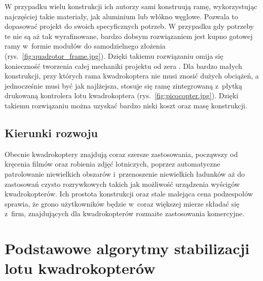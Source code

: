\documentclass[11pt, twoside]{Thesis} %
\begin{document}
W przypadku wielu konstrukcji ich autorzy sami konstruują ramę, wykorzystując najczęściej takie materiały, jak aluminium lub włókno węglowe. Pozwala to dopasować projekt do swoich specyficznych potrzeb. W przypadku gdy potrzeby te nie są aż tak wyrafinowane, bardzo dobsym rozwiązaniem jest kupno gotowej ramy w~formie modułów do samodzielnego złożenia (rys.~\ref{fig:quadrotor_frame.jpg}). Dzięki takiemu rozwiązaniu omija się konieczność tworzenia całej mechaniki projektu od zera . Dla bardzo małych konstrukcji, przy których rama kwadrokoptera nie musi znosić dużych obciążeń, a jednocześnie musi być jak najlżejsza, stosuje się ramę zintegrowaną z~płytką drukowaną kontrolera lotu kwadrokoptera (rys.~\ref{fig:picocopter.jpg}). Dzięki takiemu rozwiązaniu można uzyskać bardzo niski koszt oraz masę konstrukcji. 


\section{Kierunki rozwoju}

Obecnie kwadrokoptery znajdują coraz szersze zastosowania, począwszy od kręcenia filmów oraz robienia zdjęć lotniczych, poprzez automatyczne patrolowanie niewielkich obszarów i~przenoszenie niewielkich ładunków aż do zastosowań czysto rozrywkowych takich jak możliwość urządzenia wyścigów kwadrokopterów. Ich prostota konstrukcji oraz stale malejąca cena podzespołów sprawia, że grono użytkowników będzie w~coraz większej mierze składać się z~firm, znajdujących dla kwadrokopterów rozmaite zastosowania komercyjne. 

%



\chapter{Podstawowe algorytmy stabilizacji lotu kwadrokopterów} %

\label{Chapter3} %
\end{document}
